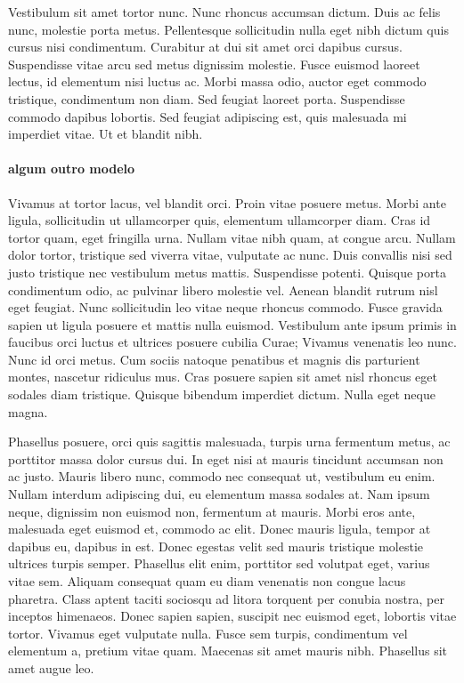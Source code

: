 Vestibulum sit amet tortor nunc. Nunc rhoncus accumsan dictum. Duis ac felis nunc, molestie porta metus. Pellentesque sollicitudin nulla eget nibh dictum quis cursus nisi condimentum. Curabitur at dui sit amet orci dapibus cursus. Suspendisse vitae arcu sed metus dignissim molestie. Fusce euismod laoreet lectus, id elementum nisi luctus ac. Morbi massa odio, auctor eget commodo tristique, condimentum non diam. Sed feugiat laoreet porta. Suspendisse commodo dapibus lobortis. Sed feugiat adipiscing est, quis malesuada mi imperdiet vitae. Ut et blandit nibh.

\paragraph{algum outro modelo}
Vivamus at tortor lacus, vel blandit orci. Proin vitae posuere metus. Morbi ante ligula, sollicitudin ut ullamcorper quis, elementum ullamcorper diam. Cras id tortor quam, eget fringilla urna. Nullam vitae nibh quam, at congue arcu. Nullam dolor tortor, tristique sed viverra vitae, vulputate ac nunc. Duis convallis nisi sed justo tristique nec vestibulum metus mattis. Suspendisse potenti. Quisque porta condimentum odio, ac pulvinar libero molestie vel. Aenean blandit rutrum nisl eget feugiat. Nunc sollicitudin leo vitae neque rhoncus commodo. Fusce gravida sapien ut ligula posuere et mattis nulla euismod. Vestibulum ante ipsum primis in faucibus orci luctus et ultrices posuere cubilia Curae; Vivamus venenatis leo nunc. Nunc id orci metus. Cum sociis natoque penatibus et magnis dis parturient montes, nascetur ridiculus mus. Cras posuere sapien sit amet nisl rhoncus eget sodales diam tristique. Quisque bibendum imperdiet dictum. Nulla eget neque magna.

Phasellus posuere, orci quis sagittis malesuada, turpis urna fermentum metus, ac porttitor massa dolor cursus dui. In eget nisi at mauris tincidunt accumsan non ac justo. Mauris libero nunc, commodo nec consequat ut, vestibulum eu enim. Nullam interdum adipiscing dui, eu elementum massa sodales at. Nam ipsum neque, dignissim non euismod non, fermentum at mauris. Morbi eros ante, malesuada eget euismod et, commodo ac elit. Donec mauris ligula, tempor at dapibus eu, dapibus in est. Donec egestas velit sed mauris tristique molestie ultrices turpis semper. Phasellus elit enim, porttitor sed volutpat eget, varius vitae sem. Aliquam consequat quam eu diam venenatis non congue lacus pharetra. Class aptent taciti sociosqu ad litora torquent per conubia nostra, per inceptos himenaeos. Donec sapien sapien, suscipit nec euismod eget, lobortis vitae tortor. Vivamus eget vulputate nulla. Fusce sem turpis, condimentum vel elementum a, pretium vitae quam. Maecenas sit amet mauris nibh. Phasellus sit amet augue leo. 


